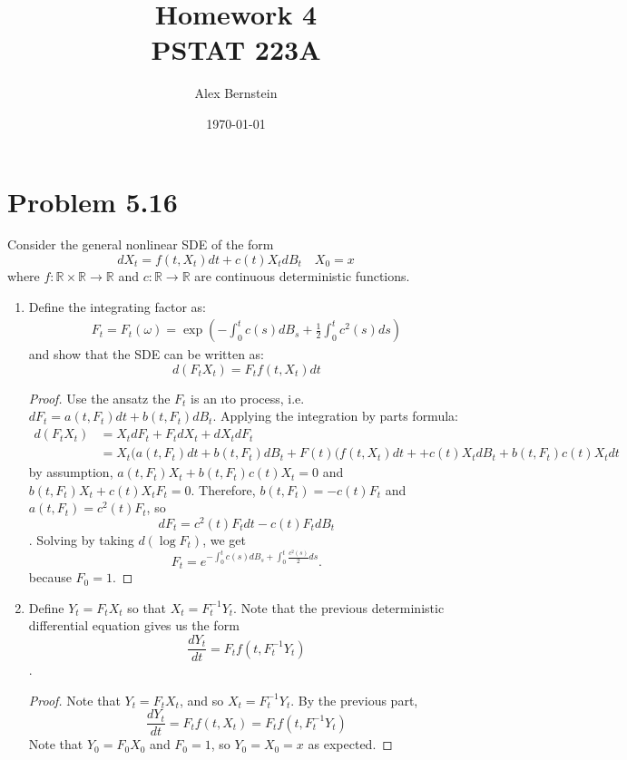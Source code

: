 \documentclass[11pt]{article}
\date{\today}
\newcommand{\bbr}{\mathbb{R}}
\renewcommand{\to}{\longrightarrow}
\begin{document}
\title{Homework 4 \\ \large PSTAT 223A \vspace{-2ex}}
\author{Alex Bernstein \vspace{-2ex}}
\maketitle
\section*{Problem 5.16}
 Consider the general nonlinear SDE of the form 
 $$ dX_t = f(t,X_t) dt + c(t) X_t dB_t \quad X_0 = x$$
 where $f: \bbr \times \bbr \to \bbr$ and $c: \bbr \to \bbr$ are continuous deterministic functions.
 \begin{enumerate}
 \item Define the integrating factor as: 
 \begin{align*}
 F _ { t } = F _ { t } ( \omega ) = \exp \left( - \int _ { 0 } ^ { t } c ( s ) d B _ { s } + \frac { 1 } { 2 } \int _ { 0 } ^ { t } c ^ { 2 } ( s ) d s \right)
 \end{align*}
 and show that the SDE can be written as: $$ d(F_t X_t) = F_t f(t,X_t) dt$$
 \begin{proof}
 Use the ansatz the $F_t$ is an \i to process, i.e. $dF_t = a(t,F_t) dt + b(t,F_t) dB_t$.  Applying the integration by parts formula:
\begin{align*}
 d(F_t X_t) &= X_t dF_t + F_t dX_t + dX_t dF_t \\
 &= X_t (a(t,F_t) dt + b(t,F_t) dB_t + F(t)(f(t,X_t) dt + + c(t) X_t dB_t + b(t,F_t) c(t) X_t dt
\end{align*}
by assumption, $a(t,F_t)X_t + b(t,F_t)c(t) X_t = 0$ and $b(t,F_t)X_t +c(t)X_t F_t =0$.  Therefore, $b(t,F_t) = -c(t)F_t$ and $a(t,F_t) = c^2(t)F_t$, so
$$ dF_t = c^2(t) F_t dt - c(t) F_t dB_t$$.  Solving by taking $d ( \log F_t)$, we get $$F_t = e^{-\int_0^t c(s) dB_s + \int_0^t \frac{c^2(s)}{2} ds}.$$ because $F_0=1$.
 \end{proof}
 \item Define $Y_t  = F_t X_t$ so that $X_t = F_t^{-1} Y_t$.  Note that the previous deterministic differential equation gives us the form
 $$ \frac{dY_t}{dt} = F_t f(t, F_t^{-1} Y_t)$$.
 \begin{proof}
 Note that $Y_t = F_t X_t$, and so $X_t = F_t^{-1} Y_t$.  By the previous part, $$\frac{dY_t}{dt}= F_t f(t,X_t)= F_t f(t,F_t^{-1}Y_t)$$  Note that $Y_0 = F_0 X_0$ and $F_0=1$, so $Y_0=X_0=x$ as expected.

\end{proof}
\end{enumerate}
\end{document}
